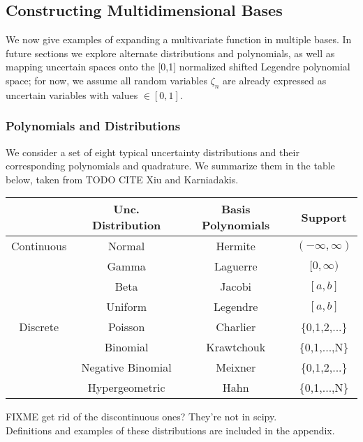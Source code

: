 \subsection{Constructing Multidimensional Bases}
We now give examples of expanding a multivariate function in multiple bases.  In future sections we explore alternate distributions and polynomials, as well as mapping uncertain spaces onto the [0,1] normalized shifted Legendre polynomial space; for now, we assume all random variables $\zeta_n$ are already expressed as uncertain variables with values $\in[0,1]$.

\subsubsection{Polynomials and Distributions}
We consider a set of eight typical uncertainty distributions and their corresponding polynomials and quadrature.  We summarize them in the table below, taken from TODO CITE Xiu and Karniadakis.  
\begin{center}
\begin{tabular}{c|c|c|c}
 & Unc. Distribution & Basis Polynomials & Support \\ \hline\hline
Continuous & Normal & Hermite & $(-\infty,\infty)$ \\
 & Gamma & Laguerre & $[0,\infty)$ \\
 & Beta & Jacobi & $[a,b]$ \\
 & Uniform & Legendre & $[a,b]$ \\ \hline
Discrete & Poisson & Charlier & \{0,1,2,...\}\\
 & Binomial & Krawtchouk & \{0,1,...,N\}\\
 & Negative Binomial & Meixner & \{0,1,2,...\}\\
 & Hypergeometric & Hahn & \{0,1,...,N\}
\end{tabular}
\end{center}
FIXME get rid of the discontinuous ones?  They're not in scipy.\\
Definitions and examples of these distributions are included in the appendix.

